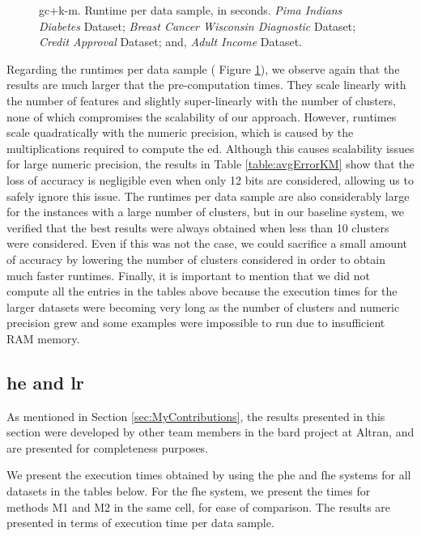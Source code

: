 \begin{figure}[hpt]
\caption[\acs{gc}+\acs{k-m}. Runtime per data sample, in seconds. All datasets.]{\acs{gc}+\acs{k-m}. Runtime per data sample, in seconds.
 \emph{Pima Indians Diabetes} Dataset;
 \emph{Breast Cancer Wisconsin Diagnostic} Dataset;
 \emph{Credit Approval} Dataset; and,
 \emph{Adult Income} Dataset.}%
\label{fig:km-gc}%
\end{figure}

Regarding the runtimes per data sample (
Figure \ref{fig:km-gc}), we observe again that the results are much larger that the pre-computation times. They scale linearly with the number of features and slightly super-linearly with the number of clusters, none of which compromises the scalability of our approach. However, runtimes scale quadratically with the numeric precision, which is caused by the multiplications required to compute the \ac{ed}. Although this causes scalability issues for large numeric precision, the results in Table \ref{table:avgErrorKM} show that the loss of accuracy is negligible even when only 12 bits are considered, allowing us to safely ignore this issue. The runtimes per data sample are also considerably large for the instances with a large number of clusters, but in our baseline system, we verified that the best results were always obtained when less than 10 clusters were considered. Even if this was not the case, we could sacrifice a small amount of accuracy by lowering the number of clusters considered in order to obtain much faster runtimes. Finally, it is important to mention that we did not compute all the entries in the tables above because the execution times for the larger datasets were becoming very long as the number of clusters and numeric precision grew and some examples were impossible to run due to insufficient RAM memory.



\subsection{\acl{he} and \acl{lr}}
\label{ssec:exec_he_lr}

As mentioned in Section \ref{sec:MyContributions}, the results presented in this section were developed by other team members in the \ac{bard} project at Altran, and are presented for completeness purposes.


We present the execution times obtained by using the \ac{phe} and \ac{fhe} systems for all datasets in the tables below. For the \ac{fhe} system, we present the times for methods M1 and M2 in the same cell, for ease of comparison. The results are presented in terms of execution time per data sample. 


